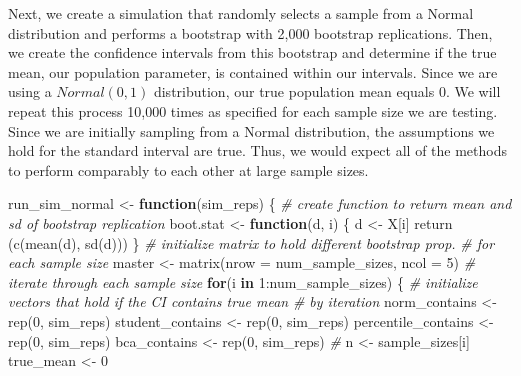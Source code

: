\documentclass[12pt]{article}
\newenvironment{Shaded}{\begin{snugshade}}{\end{snugshade}}
\newcommand{\AttributeTok}[1]{\textcolor[rgb]{0.77,0.63,0.00}{#1}}
\newcommand{\CommentTok}[1]{\textcolor[rgb]{0.56,0.35,0.01}{\textit{#1}}}
\newcommand{\ControlFlowTok}[1]{\textcolor[rgb]{0.13,0.29,0.53}{\textbf{#1}}}
\newcommand{\DecValTok}[1]{\textcolor[rgb]{0.00,0.00,0.81}{#1}}
\newcommand{\FunctionTok}[1]{\textcolor[rgb]{0.00,0.00,0.00}{#1}}
\newcommand{\NormalTok}[1]{#1}
\newcommand{\OtherTok}[1]{\textcolor[rgb]{0.56,0.35,0.01}{#1}}
\newcommand{\SpecialCharTok}[1]{\textcolor[rgb]{0.00,0.00,0.00}{#1}}
\begin{document}
Next, we create a simulation that randomly selects a sample from a
Normal distribution and performs a bootstrap with 2,000 bootstrap
replications. Then, we create the confidence intervals from this
bootstrap and determine if the true mean, our population parameter, is
contained within our intervals. Since we are using a \(Normal(0,1)\)
distribution, our true population mean equals 0. We will repeat this
process 10,000 times as specified for each sample size we are testing.
Since we are initially sampling from a Normal distribution, the
assumptions we hold for the standard interval are true. Thus, we would
expect all of the methods to perform comparably to each other at large
sample sizes.

\begin{Shaded}
\begin{Highlighting}[]
\NormalTok{run\_sim\_normal }\OtherTok{\textless{}{-}} \ControlFlowTok{function}\NormalTok{(sim\_reps) \{}
  \CommentTok{\# create function to return mean and sd of bootstrap replication}
\NormalTok{  boot.stat }\OtherTok{\textless{}{-}} \ControlFlowTok{function}\NormalTok{(d, i) \{}
\NormalTok{    d }\OtherTok{\textless{}{-}}\NormalTok{ X[i]}
    \FunctionTok{return}\NormalTok{ (}\FunctionTok{c}\NormalTok{(}\FunctionTok{mean}\NormalTok{(d), }\FunctionTok{sd}\NormalTok{(d)))}
\NormalTok{  \}}
  \CommentTok{\# initialize matrix to hold different bootstrap prop. }
  \CommentTok{\# for each sample size}
\NormalTok{  master }\OtherTok{\textless{}{-}} \FunctionTok{matrix}\NormalTok{(}\AttributeTok{nrow =}\NormalTok{ num\_sample\_sizes, }\AttributeTok{ncol =} \DecValTok{5}\NormalTok{)}
  \CommentTok{\# iterate through each sample size}
  \ControlFlowTok{for}\NormalTok{(i }\ControlFlowTok{in} \DecValTok{1}\SpecialCharTok{:}\NormalTok{num\_sample\_sizes) \{}
    \CommentTok{\# initialize vectors that hold if the CI contains true mean }
    \CommentTok{\# by iteration}
\NormalTok{    norm\_contains }\OtherTok{\textless{}{-}} \FunctionTok{rep}\NormalTok{(}\DecValTok{0}\NormalTok{, sim\_reps)}
\NormalTok{    student\_contains }\OtherTok{\textless{}{-}} \FunctionTok{rep}\NormalTok{(}\DecValTok{0}\NormalTok{, sim\_reps)}
\NormalTok{    percentile\_contains }\OtherTok{\textless{}{-}} \FunctionTok{rep}\NormalTok{(}\DecValTok{0}\NormalTok{, sim\_reps)}
\NormalTok{    bca\_contains }\OtherTok{\textless{}{-}} \FunctionTok{rep}\NormalTok{(}\DecValTok{0}\NormalTok{, sim\_reps)}
    \CommentTok{\# }
\NormalTok{    n }\OtherTok{\textless{}{-}}\NormalTok{ sample\_sizes[i]}
\NormalTok{    true\_mean }\OtherTok{\textless{}{-}} \DecValTok{0}

\end{Highlighting}
\end{Shaded}
\end{document}

